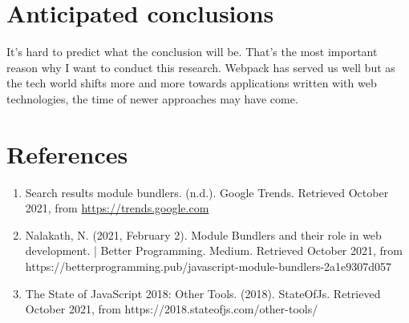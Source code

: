 \section{Anticipated conclusions}
\label{sec:verwachte_conclusies}

It's hard to predict what the conclusion will be. That's the most important reason why I want to conduct this research. Webpack has served us well but as the tech world shifts more and more towards applications written with web technologies, the time of newer approaches may have come.

\section{References}
\label{sec:references}

\begin{enumerate}
    \item Search results module bundlers. (n.d.). Google Trends. Retrieved October 2021, from \href{https://trends.google.com/trends/explore?date=all&geo=BE&q=\%2Fg\%2F11clg_kyfc,\%2Fm\%2F02qkmx0,\%2Fm\%2F012ccfhw}{https://trends.google.com}
    \item Nalakath, N. (2021, February 2). Module Bundlers and their role in web development. | Better Programming. Medium. Retrieved October 2021, from https://betterprogramming.pub/javascript-module-bundlers-2a1e9307d057
    \item The State of JavaScript 2018: Other Tools. (2018). StateOfJs. Retrieved October 2021, from https://2018.stateofjs.com/other-tools/
\end{enumerate}

